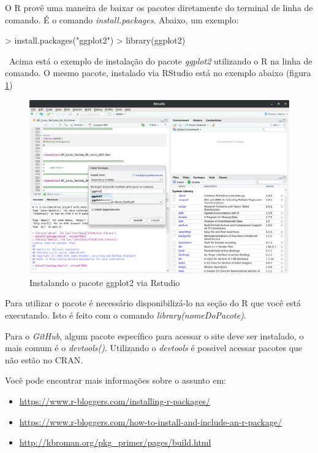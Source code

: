 \documentclass[12pt,a4paper,oneside]{erdc}
\begin{document}
O R provê uma maneira de baixar os pacotes diretamente do terminal de linha de comando. É o comando \textit{install.packages}. Abaixo, um exemplo:

\begin{Schunk}
\begin{Sinput}
> install.packages("ggplot2")
> library(ggplot2)
\end{Sinput}
\end{Schunk}

\
Acima está o exemplo de instalação do pacote \textit{ggplot2} utilizando o R na linha de comando. O mesmo pacote, instalado via RStudio está no exemplo abaixo (figura \ref{fig:bpcursoteccomp002019f01-11}) 


\begin{figure}[htpb]
	\centering
	\includegraphics[width=\linewidth]{../figs/BP_Curso_TecComp_00_2019_f01-11.png}
	\caption{Instalando o pacote ggplot2 via Rstudio}
	\label{fig:bpcursoteccomp002019f01-11}
\end{figure}

Para utilizar o pacote é necessário disponibilizá-lo na seção do R que você está executando. Isto é feito com o comando \textit{library(nomeDoPacote)}.


Para o \textit{GitHub}, algum pacote específico para acessar o site deve ser instalado, o mais comum é o \textit{devtools()}. Utilizando o \textit{devtools} é possivel acessar pacotes que não estão no CRAN. 

Você pode encontrar mais informações sobre o assunto em:

\begin{itemize}
	\item \url{https://www.r-bloggers.com/installing-r-packages/}
	
	\item \url{https://www.r-bloggers.com/how-to-install-and-include-an-r-package/}
	
	\item \url{http://kbroman.org/pkg_primer/pages/build.html}
	
\end{itemize}
\end{document}
